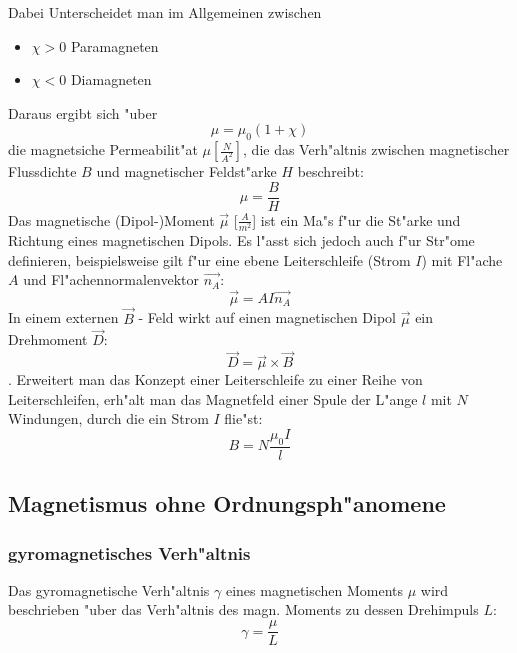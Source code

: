             Dabei Unterscheidet man im Allgemeinen zwischen
            \begin{itemize}
                \item $\chi > 0$ Paramagneten
                \item $\chi < 0$ Diamagneten
            \end{itemize}
            Daraus ergibt sich "uber
            \begin{equation}
                \mu = \mu_0 (1 + \chi)
            \end{equation}
            die magnetsiche Permeabilit"at $\mu [\frac{N}{A^2}]$, die das Verh"altnis zwischen magnetischer Flussdichte $B$ und magnetischer Feldst"arke $H$ beschreibt:
            $$ \mu = \frac{B}{H}$$
            Das magnetische (Dipol-)Moment $\vec{\mu}$ [$\frac{A}{m^2}$] ist ein Ma"s f"ur die St"arke
            und Richtung eines magnetischen Dipols. Es l"asst sich jedoch auch f"ur Str"ome definieren, beispielsweise gilt f"ur eine ebene
            Leiterschleife (Strom $I$) mit Fl"ache $A$ und Fl"achennormalenvektor $\vec{n_A}$:
            \begin{equation}
                \vec{\mu} = A I \vec{n_A}
            \end{equation}
            In einem externen $\vec{B}$ - Feld wirkt auf einen magnetischen Dipol $\vec{\mu}$ ein Drehmoment $\vec{D}$:
            \begin{equation}
                \vec{D} = \vec{\mu} \times \vec{B}
            \end{equation}.
            Erweitert man das Konzept einer Leiterschleife zu einer Reihe von Leiterschleifen, erh"alt man das Magnetfeld einer Spule der L"ange $l$ mit $N$ Windungen, durch die ein Strom $I$ flie"st:
            \begin{equation}
                B = N \frac{\mu_0 I}{l}
            \end{equation}
    \subsection{Magnetismus ohne Ordnungsph"anomene}
        \subsubsection*{gyromagnetisches Verh"altnis}
            Das gyromagnetische Verh"altnis $\gamma$ eines magnetischen Moments $\mu$ wird beschrieben "uber das Verh"altnis
            des magn. Moments zu dessen Drehimpuls $L$:
            \begin{equation}
                \gamma = \frac{\mu}{L}
            \end{equation}

